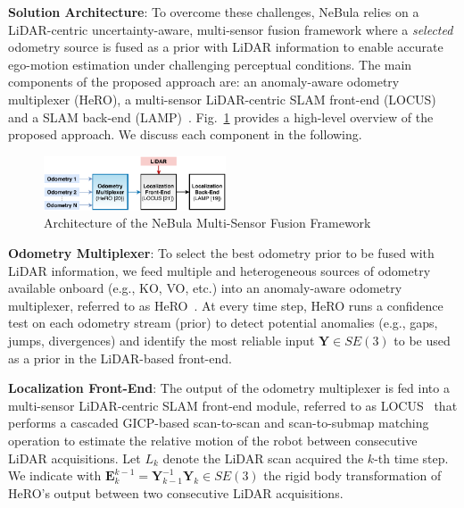 \documentclass[letterpaper, 10pt, conference]{ieeeconf}      %
\newcommand{\ph}[1]{{\textbf{#1}:}} %
\begin{document}
\ph{Solution Architecture} To overcome these challenges, NeBula relies on a LiDAR-centric uncertainty-aware, multi-sensor fusion framework where a \emph{selected} odometry source is fused as a prior with LiDAR information to enable accurate ego-motion estimation under challenging perceptual conditions. The main components of the proposed approach are:  an anomaly-aware odometry multiplexer (HeRO),  a multi-sensor LiDAR-centric SLAM front-end (LOCUS) and  a SLAM back-end (LAMP)~\cite{Ebadi2020}. Fig.~\ref{architecture} provides a high-level overview of the proposed approach. We discuss each component in the following.

\begin{figure}[t]
  \centering
  \includegraphics[width=0.48\textwidth]{spot_iros/graphics/architecture.pdf}
  \caption{Architecture of the NeBula Multi-Sensor Fusion Framework}
  \label{architecture}
\end{figure}



\ph{Odometry Multiplexer} To select the best odometry prior to be fused with LiDAR information, we feed multiple and heterogeneous sources of odometry available onboard (e.g., KO, VO, etc.) into an anomaly-aware odometry multiplexer, referred to as HeRO~\cite{Santamaria-navarro2019}. At every time step, HeRO runs a confidence test on each odometry stream (prior) to detect potential anomalies %
(e.g., gaps, jumps, divergences) and identify the most reliable input $\textbf{Y} \in SE(3)$ to be used as a prior in the LiDAR-based front-end.



\ph{Localization Front-End} The output of the odometry multiplexer is fed into a multi-sensor LiDAR-centric SLAM front-end module, referred to as LOCUS~\cite{Palieri2020} that performs a cascaded GICP-based scan-to-scan and scan-to-submap matching operation to estimate the relative motion of the robot between consecutive LiDAR acquisitions. Let $L_{k}$ denote the LiDAR scan acquired the $k$-th time step. We indicate with $\textbf{E}^{k-1}_{k} = \textbf{Y}^{-1}_{k-1}\textbf{Y}_k\in SE(3)$ the rigid body transformation of HeRO's output between two consecutive LiDAR acquisitions. %
\end{document}
